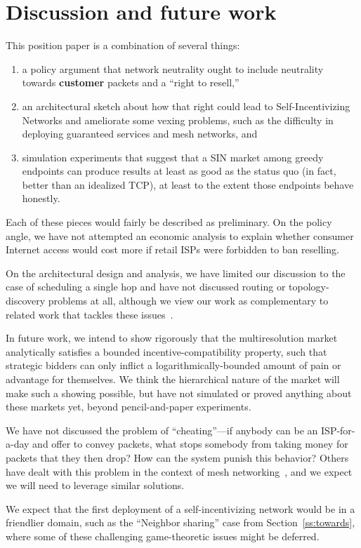 \section{Discussion and future work}
\label{sec:limits}

This position paper is a combination of several things:

\begin{enumerate}

\item a policy
argument that network neutrality ought to include neutrality towards
\textbf{customer} packets and a ``right to resell,''

\item an
architectural sketch about how that right could lead to 
Self-Incentivizing Networks and ameliorate some vexing problems, such
as the difficulty in deploying guaranteed services and mesh networks,
and

\item simulation experiments that suggest that a SIN market among
greedy endpoints can produce results at least as good as the status
quo (in fact, better than an idealized TCP), at least to the extent
those endpoints behave honestly.

\end{enumerate}

Each of these pieces would fairly be described as preliminary. On the
policy angle, we have not attempted an economic analysis to explain
whether consumer Internet access would cost more if retail ISPs were
forbidden to ban reselling.

On the architectural design and analysis, we have limited our
discussion to the case of scheduling a single hop and have not
discussed routing or topology-discovery problems at all, although we
view our work as complementary to related work that tackles these
issues~\cite{routebazaar15, esquivel09}.

In future work, we intend to show rigorously that the multiresolution
market analytically satisfies a bounded incentive-compatibility
property, such that strategic bidders can only inflict a
logarithmically-bounded amount of pain or advantage for themselves. We
think the hierarchical nature of the market will make such a showing
possible, but have not simulated or proved anything about these
markets yet, beyond pencil-and-paper experiments.

We have not discussed the problem of ``cheating''---if anybody can be
an ISP-for-a-day and offer to convey packets, what stops somebody from
taking money for packets that they then drop? How can the system
punish this behavior? Others have dealt with this problem in the
context of mesh networking~\cite{onions14, torpath14, kadupul15}, and
we expect we will need to leverage similar solutions.

We expect that the first deployment of a self-incentivizing network
would be in a friendlier domain, such as the ``Neighbor
sharing'' case from Section~\ref{ss:towards}, where some of these
challenging game-theoretic issues might be deferred.
